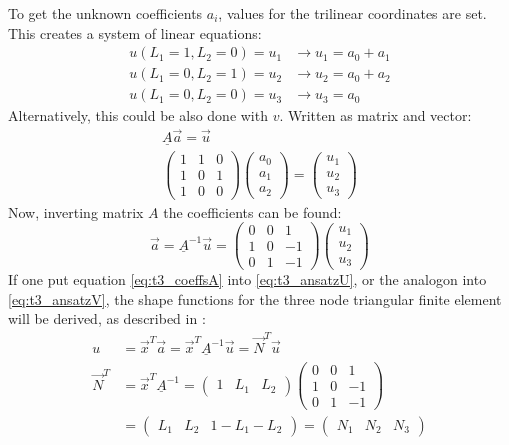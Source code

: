 \documentclass[11pt,twoside]{scrartcl}
\begin{document}
  To get the unknown coefficients $a_i$, values for the trilinear coordinates are set. This creates a system of linear equations:
  \begin{align}
  u(L_1=1, L_2=0) = u_1 &\rightarrow u_1 = a_0 + a_1 \nonumber\\
  u(L_1=0, L_2=1) = u_2 &\rightarrow u_2 = a_0 + a_2 \nonumber\\
  u(L_1=0, L_2=0) = u_3 &\rightarrow u_3 = a_0
  \end{align}
  Alternatively, this could be also done with $v$. Written as matrix and vector:
  \begin{align}
  \underline{A} \vec{a} = \vec{u} \nonumber\\
  \begin{pmatrix}
  1 & 1 & 0\\
  1 & 0 & 1\\
  1 & 0 & 0
  \end{pmatrix} \begin{pmatrix}
  a_0 \\ a_1 \\ a_2
  \end{pmatrix} = \begin{pmatrix}
  u_1 \\ u_2 \\ u_3
  \end{pmatrix}
  \end{align}
  Now, inverting matrix $A$ the coefficients can be found:
  \begin{equation}\label{eq:t3_coeffsA}
  \vec{a} = \underline{A}^{-1} \vec{u} = \begin{pmatrix}
  0 & 0 & 1\\
  1 & 0 & -1\\
  0 & 1 & -1
  \end{pmatrix} \begin{pmatrix}
  u_1 \\ u_2 \\ u_3
  \end{pmatrix}
  \end{equation}
  If one put equation \ref{eq:t3_coeffsA} into \ref{eq:t3_ansatzU}, or the analogon into \ref{eq:t3_ansatzV}, the shape functions for the three node triangular finite element will be derived, as described in \cite{steinke2005finite}:
  \begin{align}\label{eq:t3SF}
  u &= \vec{x}^T \vec{a} = \vec{x}^T \underline{A}^{-1}\vec{u} = \vec{N}^T\vec{u} \nonumber\\
  \vec{N}^T &= \vec{x}^T \underline{A}^{-1} =
  \begin{pmatrix}
  1 & L_1 & L_2
  \end{pmatrix} \begin{pmatrix}
  0 & 0 & 1\\
  1 & 0 & -1\\
  0 & 1 & -1
  \end{pmatrix} \nonumber\\
  &= \begin{pmatrix}
  L_1 & L_2 & 1-L_1-L_2
  \end{pmatrix} = \begin{pmatrix}
  N_1 & N_2 & N_3
  \end{pmatrix}
  \end{align}
\end{document}
